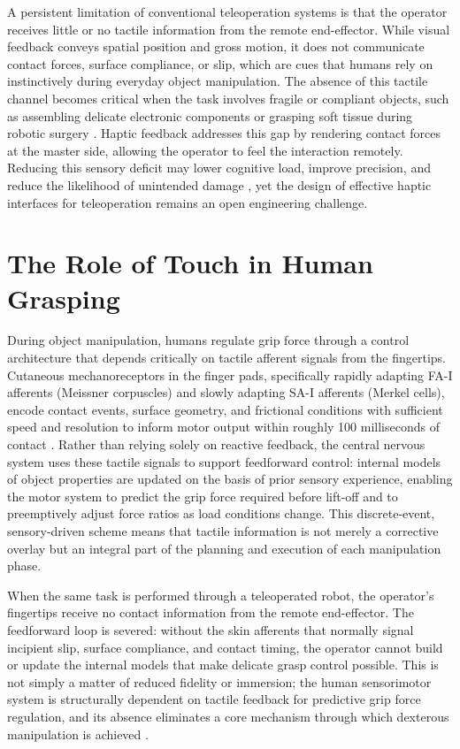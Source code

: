 \documentclass[12pt, a4paper]{report}
\begin{document}
A persistent limitation of conventional teleoperation systems is that the operator receives little or no tactile information from the remote end-effector. While visual feedback conveys spatial position and gross motion, it does not communicate contact forces, surface compliance, or slip, which are cues that humans rely on instinctively during everyday object manipulation. The absence of this tactile channel becomes critical when the task involves fragile or compliant objects, such as assembling delicate electronic components or grasping soft tissue during robotic surgery \cite{zheng2024}. Haptic feedback addresses this gap by rendering contact forces at the master side, allowing the operator to feel the interaction remotely. Reducing this sensory deficit may lower cognitive load, improve precision, and reduce the likelihood of unintended damage \cite{zheng2024}, yet the design of effective haptic interfaces for teleoperation remains an open engineering challenge.

\section{The Role of Touch in Human Grasping}
During object manipulation, humans regulate grip force through a control architecture that depends critically on tactile afferent signals from the fingertips. Cutaneous mechanoreceptors in the finger pads, specifically rapidly adapting FA-I afferents (Meissner corpuscles) and slowly adapting SA-I afferents (Merkel cells), encode contact events, surface geometry, and frictional conditions with sufficient speed and resolution to inform motor output within roughly 100 milliseconds of contact \cite{johansson2009}. Rather than relying solely on reactive feedback, the central nervous system uses these tactile signals to support feedforward control: internal models of object properties are updated on the basis of prior sensory experience, enabling the motor system to predict the grip force required before lift-off and to preemptively adjust force ratios as load conditions change. This discrete-event, sensory-driven scheme means that tactile information is not merely a corrective overlay but an integral part of the planning and execution of each manipulation phase.

When the same task is performed through a teleoperated robot, the operator's fingertips receive no contact information from the remote end-effector. The feedforward loop is severed: without the skin afferents that normally signal incipient slip, surface compliance, and contact timing, the operator cannot build or update the internal models that make delicate grasp control possible. This is not simply a matter of reduced fidelity or immersion; the human sensorimotor system is structurally dependent on tactile feedback for predictive grip force regulation, and its absence eliminates a core mechanism through which dexterous manipulation is achieved \cite{johansson2009}.
\end{document}
